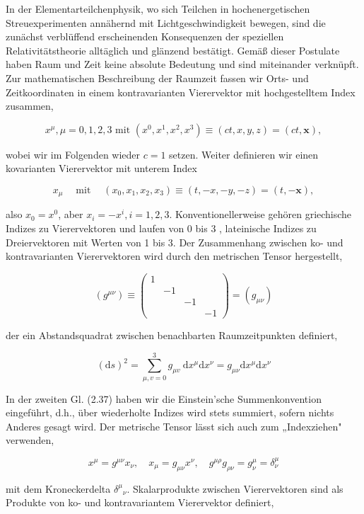 \documentclass[10pt, letterpaper]{article}
\begin{document}
In der Elementarteilchenphysik, wo sich Teilchen in hochenergetischen Streuexperimenten annähernd mit Lichtgeschwindigkeit bewegen, sind die zunächst verblüffend erscheinenden Konsequenzen der speziellen Relativitätstheorie alltäglich und glänzend bestätigt. Gemäß dieser Postulate haben Raum und Zeit keine absolute Bedeutung und sind miteinander verknüpft. Zur mathematischen Beschreibung der Raumzeit fassen wir Orts- und Zeitkoordinaten in einem kontravarianten Vierervektor mit hochgestelltem Index zusammen,

$$
x^{\mu}, \mu=0,1,2,3 \text { mit }\left(x^{0}, x^{1}, x^{2}, x^{3}\right) \equiv(c t, x, y, z)=(c t, \mathbf{x}),
$$

wobei wir im Folgenden wieder $c=1$ setzen. Weiter definieren wir einen kovarianten Vierervektor mit unterem Index

$$
x_{\mu} \quad \operatorname{mit} \quad\left(x_{0}, x_{1}, x_{2}, x_{3}\right) \equiv(t,-x,-y,-z)=(t,-\mathbf{x}),
$$

also $x_{0}=x^{0}$, aber $x_{i}=-x^{i}, i=1,2,3$. Konventionellerweise gehören griechische Indizes zu Vierervektoren und laufen von 0 bis 3 , lateinische Indizes zu Dreiervektoren mit Werten von 1 bis 3. Der Zusammenhang zwischen ko- und kontravarianten Vierervektoren wird durch den metrischen Tensor hergestellt,

$$
\left(g^{\mu \nu}\right) \equiv\left(\begin{array}{llll}
1 & & & \\
& -1 & & \\
& & -1 & \\
& & & -1
\end{array}\right)=\left(g_{\mu \nu}\right)
$$

der ein Abstandsquadrat zwischen benachbarten Raumzeitpunkten definiert,

$$
(\mathrm{d} s)^{2}=\sum_{\mu, v=0}^{3} g_{\mu v} \mathrm{~d} x^{\mu} \mathrm{d} x^{\nu}=g_{\mu \nu} \mathrm{d} x^{\mu} \mathrm{d} x^{\nu}
$$

In der zweiten Gl. (2.37) haben wir die Einstein'sche Summenkonvention eingeführt, d.h., über wiederholte Indizes wird stets summiert, sofern nichts Anderes gesagt wird. Der metrische Tensor lässt sich auch zum „Indexziehen" verwenden,

$$
x^{\mu}=g^{\mu \nu} x_{\nu}, \quad x_{\mu}=g_{\mu \nu} x^{\nu}, \quad g^{\mu \rho} g_{\rho \nu}=g_{\nu}^{\mu}=\delta_{\nu}^{\mu}
$$

mit dem Kroneckerdelta $\delta^{\mu}{ }_{\nu}$. Skalarprodukte zwischen Vierervektoren sind als Produkte von ko- und kontravariantem Vierervektor definiert,
\end{document}
